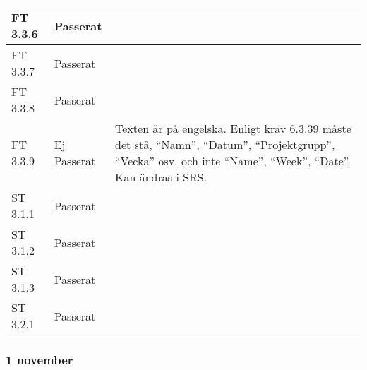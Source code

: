 \documentclass[a4paper]{article}
\begin{document}
\begin{tabular}{| l | l | p{9cm} |}
\hline
FT 3.3.6 & Passerat & \\
\hline
FT 3.3.7 & Passerat & \\
\hline
FT 3.3.8 & Passerat & \\
\hline
FT 3.3.9 & Ej Passerat & Texten är på engelska. Enligt krav 6.3.39 måste det stå, “Namn”, “Datum”, “Projektgrupp”, “Vecka” osv. och inte “Name”, “Week”, “Date”. Kan ändras i SRS. \\
\hline
ST 3.1.1 & Passerat & \\
\hline
ST 3.1.2 & Passerat & \\
\hline
ST 3.1.3 & Passerat & \\
\hline
ST 3.2.1 & Passerat & \\
\hline
\end{tabular}

\subsubsection{1 november}
\end{document}
